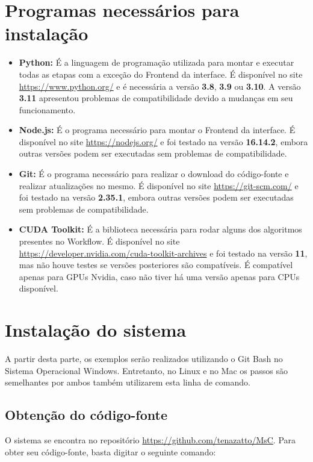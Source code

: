 \documentclass[portugues]{ic-tese}
\begin{document}
\section{Programas necessários para instalação}

\begin{itemize}
    \item {\textbf{Python:}} É a linguagem de programação utilizada para montar e executar todas as etapas com a exceção do Frontend da interface. É disponível no site \url{https://www.python.org/} e é necessária a versão \textbf{3.8}, \textbf{3.9} ou \textbf{3.10}. A versão \textbf{3.11} apresentou problemas de compatibilidade devido a mudanças em seu funcionamento.
    \item {\textbf{Node.js:}} É o programa necessário para montar o Frontend da interface. É disponível no site \url{https://nodejs.org/} e foi testado na versão \textbf{16.14.2}, embora outras versões podem ser executadas sem problemas de compatibilidade.
    \item {\textbf{Git:}} É o programa necessário para realizar o download do código-fonte e realizar atualizações no mesmo. É disponível no site \url{https://git-scm.com/} e foi testado na versão \textbf{2.35.1}, embora outras versões podem ser executadas sem problemas de compatibilidade.
	\item {\textbf{CUDA Toolkit:}} É a biblioteca necessária para rodar alguns dos algoritmos presentes no Workflow. É disponível no site \url{https://developer.nvidia.com/cuda-toolkit-archives} e foi testado na versão \textbf{11}, mas não houve testes se versões posteriores são compatíveis. É compatível apenas para GPUs Nvidia, caso não tiver há uma versão apenas para CPUs disponível.
\end{itemize}

\section{Instalação do sistema}

A partir desta parte, os exemplos serão realizados utilizando o Git Bash no Sistema Operacional Windows. Entretanto, no Linux e no Mac os passos são semelhantes por ambos também utilizarem esta linha de comando.

\subsection{Obtenção do código-fonte}

O sistema se encontra no repositório \url{https://github.com/tenazatto/MsC}. Para obter seu código-fonte, basta digitar o seguinte comando:
\end{document}
